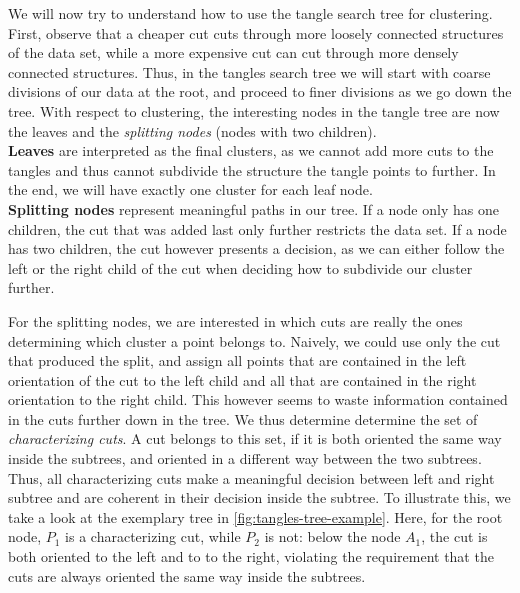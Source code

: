We will now try to understand how to use the tangle search tree for clustering. 
First, observe that a cheaper cut cuts through more loosely connected structures
of the data set, while a more expensive cut can cut through more densely connected structures.
Thus, in the tangles search tree we will start with coarse divisions of our data
at the root, and proceed to finer divisions as we go down the tree. With respect to clustering, the interesting nodes in the tangle tree are now the leaves and
the \textit{splitting nodes} (nodes with two children). \\
\textbf{Leaves} are interpreted as the final clusters, as we cannot add more cuts to the tangles and thus cannot subdivide the structure the tangle points to further. In the end, we will have
exactly one cluster for each leaf node.\\
\textbf{Splitting nodes} represent meaningful paths in our tree. If a node only has one children,
the cut that was added last only further restricts the data set. If a node has two children, 
the cut however presents a decision, as we can either follow the left or the right
child of the cut when deciding how to subdivide our cluster further. 

For the splitting nodes, we are interested in which cuts are really the ones determining 
which cluster a point belongs to. Naively, we could use only the cut that produced the split,
and assign all points that are contained in the left orientation of the cut to the
left child and all that are contained in the right orientation to the right child. This
however seems to waste information contained in the cuts further down in the tree. 
We thus determine determine the set of \textit{characterizing cuts}.  
A cut belongs to this set, if it is both oriented the same way inside the subtrees, and oriented in a different way between the two subtrees. Thus, all characterizing cuts make a meaningful decision between left and right subtree and are coherent in their decision inside the subtree. 
To illustrate this, we take a look at the exemplary tree in \autoref{fig:tangles-tree-example}. Here, for the root node, $P_1$ is a characterizing cut,
while $P_2$ is not: below the node $A_1$, the cut is both oriented to the left and to to the right, violating the requirement that the cuts are always oriented
the same way inside the subtrees. 

